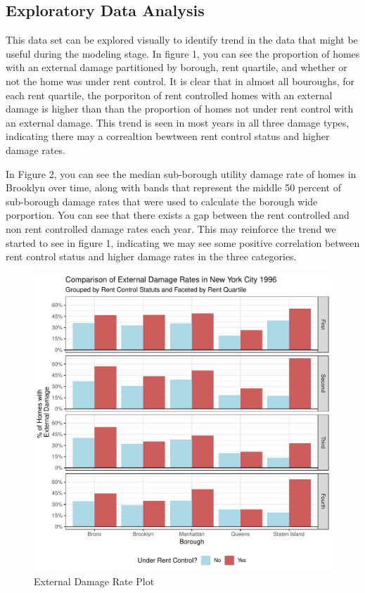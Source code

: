 \documentclass[11pt]{asaproc}\usepackage[]{graphicx}\usepackage[]{color}
\makeatletter
\def\maxwidth{ %
  \ifdim\Gin@nat@width>\linewidth
    \linewidth
  \else
    \Gin@nat@width
  \fi
}
\newenvironment{knitrout}{}{} %
\makeatother
\begin{document}
\subsection{Exploratory Data Analysis}
This data set can be explored visually to identify trend in the data that might be useful during the modeling stage. In figure 1, you can see the proportion of homes with an external damage partitioned by borough, rent quartile, and whether or not the home was under rent control. It is clear that in almost all bouroughs, for each rent quartile, the porporiton of rent controlled homes with an external damage is higher than than the proportion of homes not under rent control with an external damage. This trend is seen in most years in all three damage types, indicating there may a correaltion bewtween rent control status and higher damage rates.

In Figure 2, you can see the median sub-borough utility damage rate of homes in Brooklyn over time, along with bands that represent the middle 50 percent of sub-borough damage rates that were used to calculate the borough wide porportion. You can see that there exists a gap between the rent controlled and non rent controlled damage rates each year. This may reinforce the trend we started to see in figure 1, indicating we may see some positive correlation between rent control status and higher damage rates in the three categories.
 


\begin{figure}
\begin{center}
\begin{knitrout}
\color{fgcolor}
\includegraphics[width=\maxwidth]{figure/fig1-1} 

\end{knitrout}
\end{center}
\caption{External Damage Rate Plot}
\label{fig:one}
\end{figure}
\end{document}
